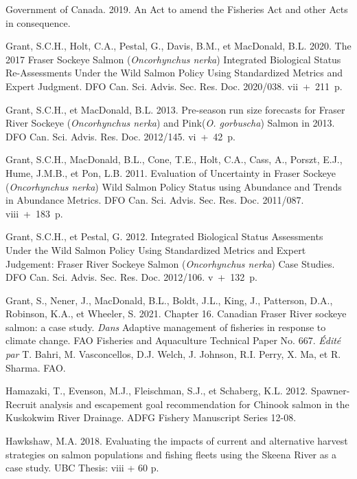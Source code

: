 \documentclass[french,11pt]{book}
\begin{document}
\begin{CSLReferences}{1}{0}
Government of Canada. 2019. {An Act to amend the Fisheries Act and other Acts in consequence}.

Grant, S.C.H., Holt, C.A., Pestal, G., Davis, B.M., et MacDonald, B.L. 2020. {The 2017 Fraser Sockeye Salmon (}{\emph{Oncorhynchus nerka}}{) Integrated Biological Status Re-Assessments Under the Wild Salmon Policy Using Standardized Metrics and Expert Judgment}. DFO Can. Sci. Advis. Sec. Res. Doc. 2020/038. vii~+~211~p.

Grant, S.C.H., et MacDonald, B.L. 2013. {Pre-season run size forecasts for Fraser River Sockeye (}{\emph{Oncorhynchus nerka}}{) and Pink(}{\emph{O. gorbuscha}}{) Salmon in 2013}. DFO Can. Sci. Advis. Res. Doc. 2012/145. vi~+~42~p.

Grant, S.C.H., MacDonald, B.L., Cone, T.E., Holt, C.A., Cass, A., Porszt, E.J., Hume, J.M.B., et Pon, L.B. 2011. {Evaluation of Uncertainty in Fraser Sockeye (}{\emph{Oncorhynchus nerka}}{) Wild Salmon Policy Status using Abundance and Trends in Abundance Metrics}. DFO Can. Sci. Advis. Sec. Res. Doc. 2011/087. viii~+~183~p.

Grant, S.C.H., et Pestal, G. 2012. {Integrated Biological Status Assessments Under the Wild Salmon Policy Using Standardized Metrics and Expert Judgement: Fraser River Sockeye Salmon (}{\emph{Oncorhynchus nerka}}{) Case Studies}. DFO Can. Sci. Advis. Sec. Res. Doc. 2012/106. v~+~132~p.

Grant, S., Nener, J., MacDonald, B.L., Boldt, J.L., King, J., Patterson, D.A., Robinson, K.A., et Wheeler, S. 2021. Chapter 16. Canadian Fraser River sockeye salmon: a case study. \emph{Dans} Adaptive management of fisheries in response to climate change. FAO Fisheries and Aquaculture Technical Paper No. 667. \emph{Édité par} T. \hspace{0pt}Bahri, M. Vasconcellos, D.J. Welch, J. Johnson, R.I. Perry, X. Ma, et R. Sharma. FAO.

Hamazaki, T., Evenson, M.J., Fleischman, S.J., et Schaberg, K.L. 2012. {Spawner-Recruit analysis and escapement goal recommendation for Chinook salmon in the Kuskokwim River Drainage}. ADFG Fishery Manuscript Series 12-08.

Hawkshaw, M.A. 2018. Evaluating the impacts of current and alternative harvest strategies on salmon populations and fishing fleets using the Skeena River as a case study. UBC Thesis: viii + 60 p.


\end{CSLReferences}
\end{document}
